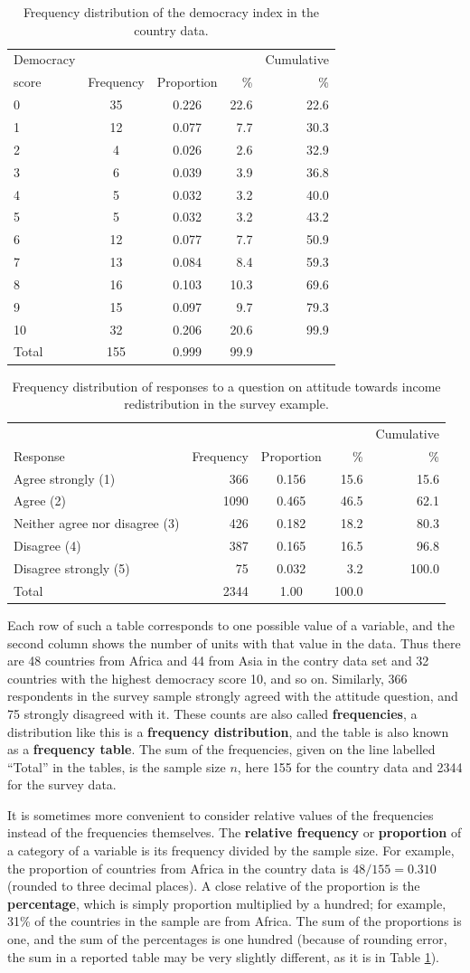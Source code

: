 \documentclass[11pt,a4paper,openany]{book}
\begin{document}
\begin{longtable}[]{@{}lccrr@{}}
\caption{\label{tab:t-democ} Frequency distribution of the democracy index
in the country data.}\tabularnewline
\toprule
Democracy & \ & \ & \ & Cumulative\tabularnewline
score & Frequency & Proportion & \% & \%\tabularnewline
0 & 35 & 0.226 & 22.6 & 22.6\tabularnewline
1 & 12 & 0.077 & 7.7 & 30.3\tabularnewline
2 & 4 & 0.026 & 2.6 & 32.9\tabularnewline
3 & 6 & 0.039 & 3.9 & 36.8\tabularnewline
4 & 5 & 0.032 & 3.2 & 40.0\tabularnewline
5 & 5 & 0.032 & 3.2 & 43.2\tabularnewline
6 & 12 & 0.077 & 7.7 & 50.9\tabularnewline
7 & 13 & 0.084 & 8.4 & 59.3\tabularnewline
8 & 16 & 0.103 & 10.3 & 69.6\tabularnewline
9 & 15 & 0.097 & 9.7 & 79.3\tabularnewline
10 & 32 & 0.206 & 20.6 & 99.9\tabularnewline
Total & 155 & 0.999 & 99.9 &\tabularnewline
\bottomrule
\end{longtable}

\begin{longtable}[]{@{}lrcrr@{}}
\caption{\label{tab:t-attitude} Frequency distribution of responses to a
question on attitude towards income redistribution in the survey
example.}\tabularnewline
\toprule
\ & \ & \ & \ & Cumulative\tabularnewline
Response & Frequency & Proportion & \% & \%\tabularnewline
Agree strongly (1) & 366 & 0.156 & 15.6 & 15.6\tabularnewline
Agree (2) & 1090 & 0.465 & 46.5 & 62.1\tabularnewline
Neither agree nor disagree (3) & 426 & 0.182 & 18.2 &
80.3\tabularnewline
Disagree (4) & 387 & 0.165 & 16.5 & 96.8\tabularnewline
Disagree strongly (5) & 75 & 0.032 & 3.2 & 100.0\tabularnewline
Total & 2344 & 1.00 & 100.0 &\tabularnewline
\bottomrule
\end{longtable}

Each row of such a table corresponds to one possible value of a
variable, and the second column shows the number of units with that
value in the data. Thus there are 48 countries from Africa and 44 from
Asia in the contry data set and 32 countries with the highest democracy
score 10, and so on. Similarly, 366 respondents in the survey sample
strongly agreed with the attitude question, and 75 strongly disagreed
with it. These counts are also called \textbf{frequencies}, a
distribution like this is a \textbf{frequency distribution}, and the
table is also known as a \textbf{frequency table}. The sum of the
frequencies, given on the line labelled ``Total'' in the tables, is the
sample size \(n\), here 155 for the country data and 2344 for the survey
data.

It is sometimes more convenient to consider relative values of the
frequencies instead of the frequencies themselves. The \textbf{relative
frequency} or \textbf{proportion} of a category of a variable is its
frequency divided by the sample size. For example, the proportion of
countries from Africa in the country data is \(48/155=0.310\) (rounded
to three decimal places). A close relative of the proportion is the
\textbf{percentage}, which is simply proportion multiplied by a hundred;
for example, 31\% of the countries in the sample are from Africa. The
sum of the proportions is one, and the sum of the percentages is one
hundred (because of rounding error, the sum in a reported table may be
very slightly different, as it is in Table \ref{tab:t-democ}).
\end{document}
